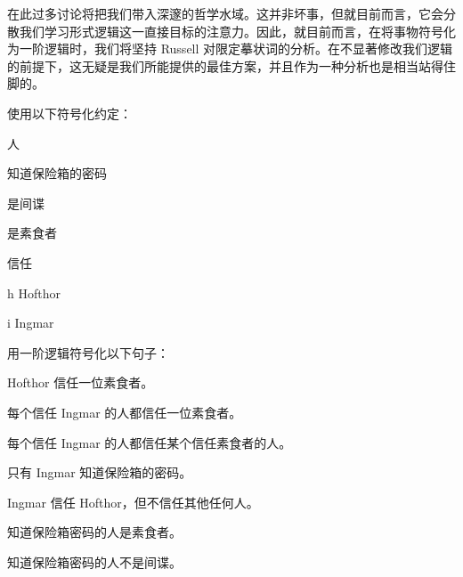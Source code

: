 在此过多讨论将把我们带入深邃的哲学水域。这并非坏事，但就目前而言，它会分散我们学习形式逻辑这一直接目标的注意力。因此，就目前而言，在将事物符号化为一阶逻辑时，我们将坚持 Russell 对限定摹状词的分析。在不显著修改我们逻辑的前提下，这无疑是我们所能提供的最佳方案，并且作为一种分析也是相当站得住脚的。

\practiceproblems

\problempart
使用以下符号化约定：
\begin{ekey}
\item[\text{论域}] 人
\item[\atom{K}{x}]  知道保险箱的密码
\item[\atom{S}{x}]  是间谍
\item[\atom{V}{x}]  是素食者
\item[\atom{T}{x,y}]  信任 
\item[h] Hofthor
\item[i] Ingmar
\end{ekey}
用一阶逻辑符号化以下句子：
\begin{compactlist}
\item Hofthor 信任一位素食者。
\item 每个信任 Ingmar 的人都信任一位素食者。
\item 每个信任 Ingmar 的人都信任某个信任素食者的人。
\item 只有 Ingmar 知道保险箱的密码。
\item Ingmar 信任 Hofthor，但不信任其他任何人。
\item 知道保险箱密码的人是素食者。
\item 知道保险箱密码的人不是间谍。
\end{compactlist}

